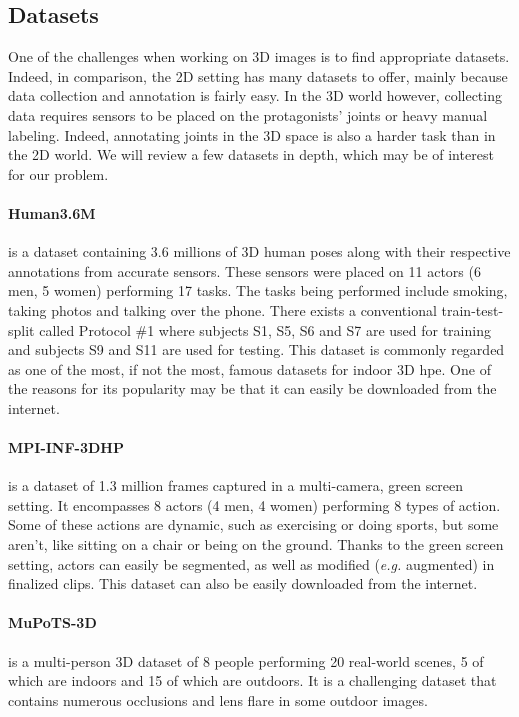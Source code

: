 \documentclass[runningheads]{llncs}
\begin{document}
\subsection{Datasets}
One of the challenges when working on 3D images is to find appropriate datasets. Indeed, in comparison, the 2D setting has many datasets to offer, mainly because data collection and annotation is fairly easy. In the 3D world however, collecting data requires sensors to be placed on the protagonists' joints or heavy manual labeling. Indeed, annotating joints in the 3D space is also a harder task than in the 2D world. We will review a few datasets in depth, which may be of interest for our problem.
\paragraph{Human3.6M} \cite{Human3.6M} is a dataset containing 3.6 millions of 3D human poses along with their respective annotations from accurate sensors. These sensors were placed on 11 actors (6 men, 5 women) performing 17 tasks. The tasks being performed include smoking, taking photos and talking over the phone. There exists a conventional train-test-split called Protocol \#1 where subjects S1, S5, S6 and S7 are used for training and subjects S9 and S11 are used for testing. This dataset is commonly regarded as one of the most, if not the most, famous datasets for indoor 3D \ac{hpe}. One of the reasons for its popularity may be that it can easily be downloaded from the internet.
\paragraph{MPI-INF-3DHP} \cite{MPI-INF-3DHP} is a dataset of 1.3 million frames captured in a multi-camera, green screen setting. It encompasses 8 actors (4 men, 4 women) performing 8 types of action. Some of these actions are dynamic, such as exercising or doing sports, but some aren't, like sitting on a chair or being on the ground. Thanks to the green screen setting, actors can easily be segmented, as well as modified (\textit{e.g.} augmented) in finalized clips. This dataset can also be easily downloaded from the internet.
\paragraph{MuPoTS-3D} \cite{MuPoTS-3D} is a multi-person 3D dataset of 8 people performing 20 real-world scenes, 5 of which are indoors and 15 of which are outdoors. It is a challenging dataset that contains numerous occlusions and lens flare in some outdoor images.
\end{document}
